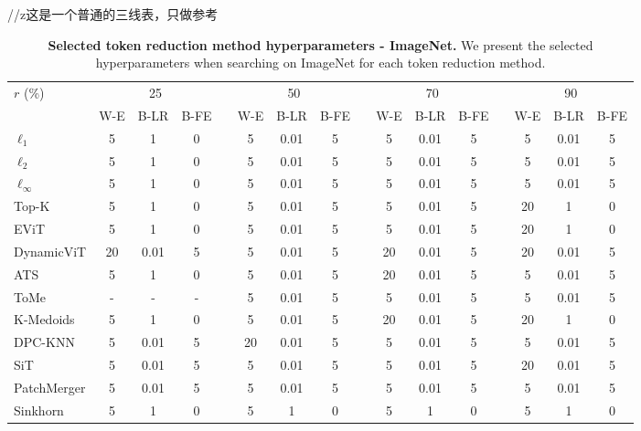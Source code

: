 \documentclass{article}
\begin{document}
//z这是一个普通的三线表，只做参考
\begin{table*}[!htp]
    \caption{\textbf{Selected token reduction method hyperparameters - ImageNet.} We present the selected hyperparameters when searching on ImageNet for each token reduction method.}
    \label{tab:imagenetHyper}
    \centering
    \begin{tabular}{@{}lccclccclccclccc@{}}
    \toprule
     $r$ (\%) & \multicolumn{3}{c}{25} &  & \multicolumn{3}{c}{50} &  & \multicolumn{3}{c}{70} &  & \multicolumn{3}{c}{90} \\\cmidrule(lr){2-4} \cmidrule(lr){6-8} \cmidrule(lr){10-12} \cmidrule(lr){14-16}
     & W-E & B-LR & B-FE & & W-E & B-LR & B-FE & & W-E & B-LR & B-FE & & W-E & B-LR & B-FE \\ \midrule
    $\ell_1$ & 5 & 1 & 0 & & 5 & 0.01 & 5 & & 5 & 0.01 & 5 & & 5 & 0.01 & 5 \\
    $\ell_2$ & 5 & 1 & 0 & & 5 & 0.01 & 5 & & 5 & 0.01 & 5 & & 5 & 0.01 & 5 \\
    $\ell_\infty$ & 5 & 1 & 0 & & 5 & 0.01 & 5 & & 5 & 0.01 & 5 & & 5 & 0.01 & 5 \\ \midrule
    Top-K & 5 & 1 & 0 & & 5 & 0.01 & 5 & & 5 & 0.01 & 5 & & 20 & 1 & 0 \\
    EViT & 5 & 1 & 0 & & 5 & 0.01 & 5 & & 5 & 0.01 & 5 & & 20 & 1 & 0 \\
    DynamicViT & 20 & 0.01 & 5 & & 5 & 0.01 & 5 & & 20 & 0.01 & 5 & & 20 & 0.01 & 5 \\
    ATS & 5 & 1 & 0 & & 5 & 0.01 & 5 & & 20 & 0.01 & 5 & & 5 & 0.01 & 5 \\ \midrule
    ToMe & - & - & - & & 5 & 0.01 & 5 & & 5 & 0.01 & 5 & & 5 & 0.01 & 5 \\
    K-Medoids & 5 & 1 & 0 & & 5 & 0.01 & 5 & & 20 & 0.01 & 5 & & 20 & 1 & 0 \\
    DPC-KNN & 5 & 0.01 & 5 & & 20 & 0.01 & 5 & & 5 & 0.01 & 5 & & 5 & 0.01 & 5 \\ \midrule
    SiT & 5 & 0.01 & 5 & & 5 & 0.01 & 5 & & 5 & 0.01 & 5 & & 20 & 0.01 & 5 \\
    PatchMerger & 5 & 0.01 & 5 & & 5 & 0.01 & 5 & & 5 & 0.01 & 5 & & 5 & 0.01 & 5 \\
    Sinkhorn & 5 & 1 & 0 & & 5 & 1 & 0 & & 5 & 1 & 0 & & 5 & 1 & 0 \\ \bottomrule
    \end{tabular}
\end{table*}
\end{document}
